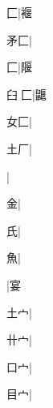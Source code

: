 \begin{multicols}{2}
{{匚}|{\cjk{}褗}\par
{\cjk{}{\cnsym{}　}矛匚}|{}\par
{匚}|{\cjk{}隁}\par
{\cjk{}臼{\cnjzr{}}匚}|{\cjk{}鼴}\par
{\cjk{}{\cnsym{}　}女匚}|{}\par
{\cjk{}{\cnsym{}　}土厂}|{}\par
{}|{}\par
{\cjk{}{\cnsym{}　}{\cnsym{}　}金}|{}\par
{\cjk{}{\cnsym{}　}{\cnsym{}　}氏}|{}\par
{\cjk{}{\cnsym{}　}{\cnsym{}　}魚}|{}\par
{}|{\cjk{}宴}\par
{\cjk{}{\cnsym{}　}土{宀}}|{}\par
{\cjk{}{\cnsym{}　}卄{宀}}|{}\par
{\cjk{}{\cnsym{}　}口{宀}}|{}\par
{\cjk{}{\cnsym{}　}目{宀}}|{}\par
}
\end{multicols}
